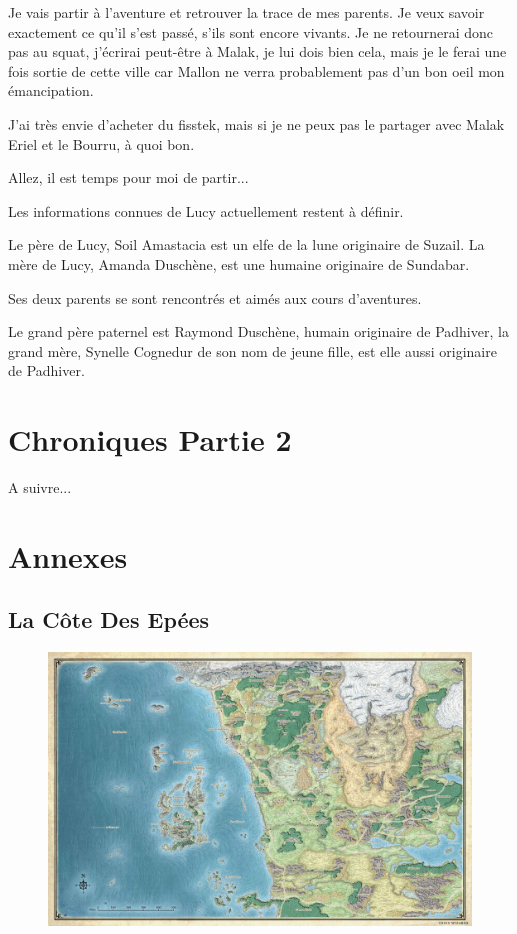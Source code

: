 \documentclass[10pt,a4paper,twoside,twocolumn,openany]{book}
\begin{document}
Je vais partir à l'aventure et retrouver la trace de mes parents. Je veux savoir exactement
ce qu'il s'est passé, s'ils sont encore vivants. Je ne retournerai donc pas au squat, j'écrirai
peut-être à Malak, je lui dois bien cela, mais je le ferai une fois sortie de cette ville car
Mallon ne verra probablement pas d'un bon oeil mon émancipation.

J'ai très envie d'acheter du fisstek, mais si je ne peux pas le partager avec 
Malak Eriel et le Bourru, à quoi bon.

Allez, il est temps pour moi de partir...

\begin{quotebox}
Les informations connues de Lucy actuellement restent à définir.

Le père de Lucy, Soil Amastacia est un elfe de la lune originaire de Suzail.
La mère de Lucy, Amanda Duschène, est une humaine originaire de Sundabar.

Ses deux parents se sont rencontrés et aimés aux cours d'aventures.

Le grand père paternel est Raymond Duschène, humain originaire de Padhiver, 
la grand mère, Synelle Cognedur de son nom de jeune fille, est elle aussi
originaire de Padhiver.
\end{quotebox}

\chapter{Chroniques Partie 2}

A suivre...

\onecolumn
\chapter{Annexes}

\section{La Côte Des Epées} 

\begin{figure}[!h]
\centering
\includegraphics[width=\textwidth,keepaspectratio]{soc.jpg}
\end{figure}
\end{document}

